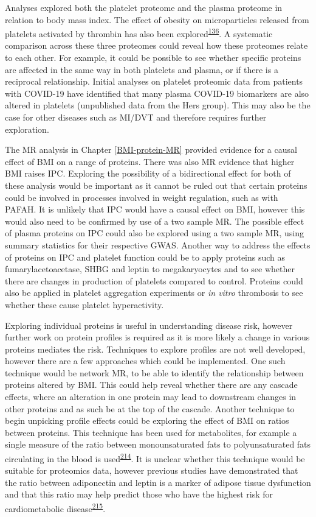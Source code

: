 \documentclass[11pt,twoside]{bristolthesis}
\begin{document}
Analyses explored both the platelet proteome and the plasma proteome in relation to body mass index. The effect of obesity on microparticles released from platelets activated by thrombin has also been explored\textsuperscript{\protect\hyperlink{ref-Grande2019}{136}}. A systematic comparison across these three proteomes could reveal how these proteomes relate to each other. For example, it could be possible to see whether specific proteins are affected in the same way in both platelets and plasma, or if there is a reciprocal relationship. Initial analyses on platelet proteomic data from patients with COVID-19 have identified that many plasma COVID-19 biomarkers are also altered in platelets (unpublished data from the Hers group). This may also be the case for other diseases such as MI/DVT and therefore requires further exploration.

The MR analysis in Chapter \ref{BMI-protein-MR} provided evidence for a causal effect of BMI on a range of proteins. There was also MR evidence that higher BMI raises IPC. Exploring the possibility of a bidirectional effect for both of these analysis would be important as it cannot be ruled out that certain proteins could be involved in processes involved in weight regulation, such as with PAFAH. It is unlikely that IPC would have a causal effect on BMI, however this would also need to be confirmed by use of a two sample MR. The possible effect of plasma proteins on IPC could also be explored using a two sample MR, using summary statistics for their respective GWAS. Another way to address the effects of proteins on IPC and platelet function could be to apply proteins such as fumarylacetoacetase, SHBG and leptin to megakaryocytes and to see whether there are changes in production of platelets compared to control. Proteins could also be applied in platelet aggregation experiments or \emph{in vitro} thrombosis to see whether these cause platelet hyperactivity.

Exploring individual proteins is useful in understanding disease risk, however further work on protein profiles is required as it is more likely a change in various proteins mediates the risk. Techniques to explore profiles are not well developed, however there are a few approaches which could be implemented. One such technique would be network MR, to be able to identify the relationship between proteins altered by BMI. This could help reveal whether there are any cascade effects, where an alteration in one protein may lead to downstream changes in other proteins and as such be at the top of the cascade. Another technique to begin unpicking profile effects could be exploring the effect of BMI on ratios between proteins. This technique has been used for metabolites, for example a single measure of the ratio between monounsaturated fats to polyunsaturated fats circulating in the blood is used\textsuperscript{\protect\hyperlink{ref-Carayol2017c}{214}}. It is unclear whether this technique would be suitable for proteomics data, however previous studies have demonstrated that the ratio between adiponectin and leptin is a marker of adipose tissue dysfunction and that this ratio may help predict those who have the highest risk for cardiometabolic disease\textsuperscript{\protect\hyperlink{ref-Fruhbeck2019}{215}}.
\end{document}
